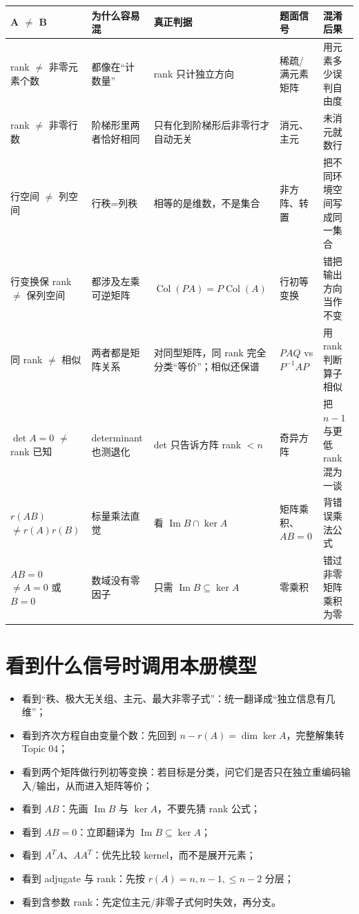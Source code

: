 \documentclass[11pt,a4paper]{ctexart}
\begin{document}
\begin{longtable}{L{2.4cm}L{3.0cm}L{3.8cm}L{3.2cm}L{\dimexpr\linewidth-13.0cm\relax}}
\toprule
\textbf{A $\neq$ B} & \textbf{为什么容易混} & \textbf{真正判据} & \textbf{题面信号} & \textbf{混淆后果}\\
\midrule
rank $\neq$ 非零元素个数 & 都像在“计数量” & rank 只计独立方向 & 稀疏/满元素矩阵 & 用元素多少误判自由度\\
rank $\neq$ 非零行数 & 阶梯形里两者恰好相同 & 只有化到阶梯形后非零行才自动无关 & 消元、主元 & 未消元就数行\\
行空间 $\neq$ 列空间 & 行秩=列秩 & 相等的是维数，不是集合 & 非方阵、转置 & 把不同环境空间写成同一集合\\
行变换保 rank $\neq$ 保列空间 & 都涉及左乘可逆矩阵 & $\operatorname{Col}(PA)=P\operatorname{Col}(A)$ & 行初等变换 & 错把输出方向当作不变\\
同 rank $\neq$ 相似 & 两者都是矩阵关系 & 对同型矩阵，同 rank 完全分类“等价”；相似还保谱 & $PAQ$ vs $P^{-1}AP$ & 用 rank 判断算子相似\\
$\det A=0$ $\neq$ rank 已知 & determinant 也测退化 & det 只告诉方阵 rank $<n$ & 奇异方阵 & 把 $n-1$ 与更低 rank 混为一谈\\
$r(AB)$ $\neq r(A)r(B)$ & 标量乘法直觉 & 看 $\operatorname{Im}B\cap\ker A$ & 矩阵乘积、$AB=0$ & 背错误乘法公式\\
$AB=0$ $\neq A=0$ 或 $B=0$ & 数域没有零因子 & 只需 $\operatorname{Im}B\subseteq\ker A$ & 零乘积 & 错过非零矩阵乘积为零\\
\bottomrule
\end{longtable}

\section{看到什么信号时调用本册模型}

\begin{itemize}
  \item 看到“秩、极大无关组、主元、最大非零子式”：统一翻译成“独立信息有几维”；
  \item 看到齐次方程自由变量个数：先回到 $n-r(A)=\dim\ker A$，完整解集转 Topic 04；
  \item 看到两个矩阵做行列初等变换：若目标是分类，问它们是否只在独立重编码输入/输出，从而进入矩阵等价；
  \item 看到 $AB$：先画 $\operatorname{Im}B$ 与 $\ker A$，不要先猜 rank 公式；
  \item 看到 $AB=0$：立即翻译为 $\operatorname{Im}B\subseteq\ker A$；
  \item 看到 $A^TA$、$AA^T$：优先比较 kernel，而不是展开元素；
  \item 看到 adjugate 与 rank：先按 $r(A)=n,n-1,\le n-2$ 分层；
  \item 看到含参数 rank：先定位主元/非零子式何时失效，再分支。
\end{itemize}
\end{document}
